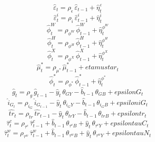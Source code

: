 \begin{dmath}
{\hat{\varepsilon}_{t}}={\rho_{\epsilon}}\, {\hat{\varepsilon}_{t-1}}+{\hat{\eta}^{\varepsilon}_{t}}
\end{dmath}
\begin{dmath}
{\hat{\varepsilon}^i_{t}}={\rho_{i}}\, {\hat{\varepsilon}^i_{t-1}}+{\hat{\eta}^{i}_{t}}
\end{dmath}
\begin{dmath}
{\hat{\phi}^W_{t}}={\rho_{\phi^W}}\, {\hat{\phi}^W_{t-1}}+{\hat{\eta}^{\phi^W}_{t}}
\end{dmath}
\begin{dmath}
{\hat{\phi}^H_{t}}={\rho_{\phi^H}}\, {\hat{\phi}^H_{t-1}}+{\hat{\eta}^{\phi^H}_{t}}
\end{dmath}
\begin{dmath}
{\hat{\phi}^X_{t}}={\rho_{\phi^X}}\, {\hat{\phi}^X_{t-1}}+{\hat{\eta}^{\phi^X}_{t}}
\end{dmath}
\begin{dmath}
{\hat{\mu}^*_{t}}={\rho_{\mu^*}}\, {\hat{\mu}^*_{t-1}}+{etamustar_{t}}
\end{dmath}
\begin{dmath}
{\hat{\phi}^*_{t}}={\rho_{\phi^*}}\, {\hat{\phi}^*_{t-1}}+{\hat{\eta}^{\phi^*}_{t}}
\end{dmath}
\begin{dmath}
{\hat{g}_{t}}={\rho_{g}}\, {\hat{g}_{t-1}}-{\hat{y}_{t}}\, {\theta_{GY}}-{\hat{b}_{t-1}}\, {\theta_{GB}}+{epsilonG_{t}}
\end{dmath}
\begin{dmath}
{\hat{i}_G_{t}}={\rho_{i_G}}\, {\hat{i}_G_{t-1}}-{\hat{y}_{t}}\, {\theta_{i_GY}}-{\hat{b}_{t-1}}\, {\theta_{i_GB}}+{epsiloniG_{t}}
\end{dmath}
\begin{dmath}
{\hat{tr}_{t}}={\rho_{tr}}\, {\hat{tr}_{t-1}}-{\hat{y}_{t}}\, {\theta_{trY}}-{\hat{b}_{t-1}}\, {\theta_{trB}}+{epsilontr_{t}}
\end{dmath}
\begin{dmath}
{\hat{\tau}^c_{t}}={\rho_{\tau^c}}\, {\hat{\tau}^c_{t-1}}+{\hat{b}_{t-1}}\, {\theta_{\tau^cB}}+{\hat{y}_{t}}\, {\theta_{\tau^cY}}+{epsilontauC_{t}}
\end{dmath}
\begin{dmath}
{\hat{\tau}^w_{t}}={\rho_{\tau^w}}\, {\hat{\tau}^w_{t-1}}+{\hat{b}_{t-1}}\, {\theta_{\tau^wB}}+{\hat{y}_{t}}\, {\theta_{\tau^wY}}+{epsilontauN_{t}}
\end{dmath}
